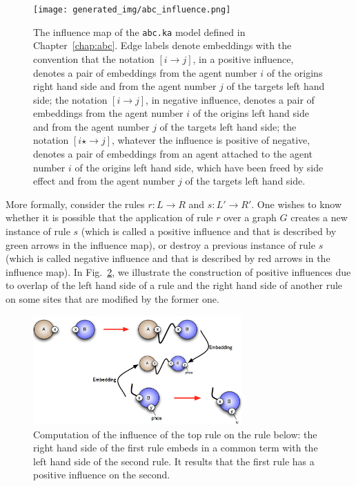 \documentclass[11pt]{book}
\def\ttt#1{\texttt{#1}}
\def\rar{\rightarrow}
\begin{document}
\begin{figure}[htbp] %
   \centering
   \texttt{[image: generated\_img/abc\_influence.png]}
   \caption{The influence map of the \ttt{abc.ka} model defined in Chapter~\ref{chap:abc}. Edge labels denote embeddings with the convention that
the notation $[i\rar j]$, in a positive influence, denotes a pair of embeddings from the agent number $i$ of the origin{\textquotesingle}s right hand side and from the agent number $j$ of the target{\textquotesingle}s left hand side;
the notation $[i\rar j]$, in negative influence,  denotes a pair of embeddings from the agent number $i$ of the origin{\textquotesingle}s left hand side and from the agent number $j$ of the target{\textquotesingle}s left hand side;
the notation $[i\star \rar j]$, whatever the influence is positive of negative,  denotes a pair of embeddings from an agent attached to the agent number $i$  of the origin{\textquotesingle}s left hand side, which have been freed by side effect  and   from the agent number $j$ of the target{\textquotesingle}s left hand side. }
   \label{fig:kasa-abc-im}
\end{figure}

More formally, consider the rules $r:L\rar R$ and $s:L'\rar R'$. One wishes to know whether it is possible that the application of rule $r$ over a graph $G$ creates a new instance of rule $s$ (which is called a positive influence and that is described by green arrows in the influence map), or destroy a previous instance of rule $s$ (which is called negative influence and that is described by red arrows in the influence map).
In Fig.~\ref{fig:imbis}, we illustrate the construction of positive influences due to overlap of the left hand side of a rule and the right hand side of another rule on some sites that are modified by the former one.

\begin{figure}[htbp] %
   \centering
\includegraphics[width=8cm]{img/im.png}
   \caption{Computation of the influence of the top rule on the rule below: the right hand side of the first rule embeds in a common term with the left hand side of the second rule. It results that the first rule has a positive influence on the second.}
   \label{fig:imbis}
\end{figure}
\end{document}
